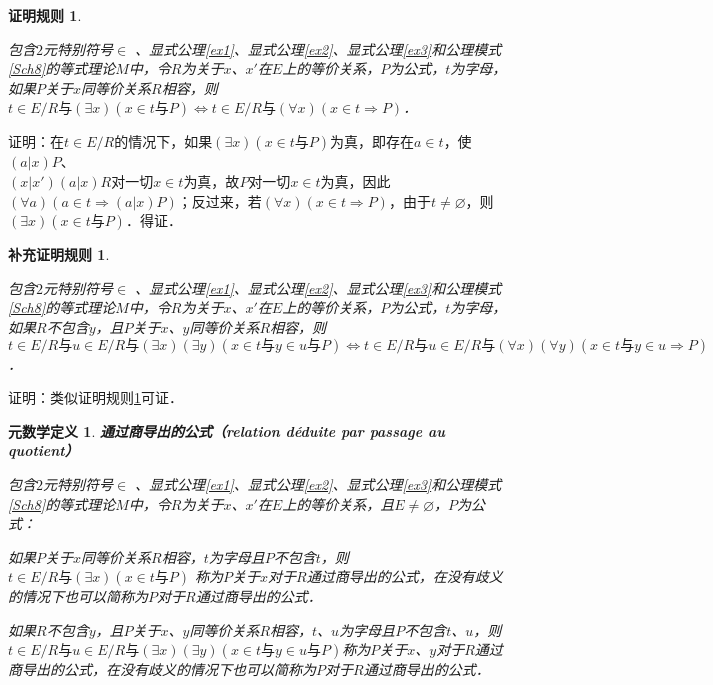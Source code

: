 \documentclass[12pt, a4paper, oneside]{book}
\newtheorem{metadef}{元数学定义}
\newtheorem{C}{证明规则}
\newtheorem{Ccor}{补充证明规则}
\begin{document}
			\begin{C}\label{C56}
				\hfill\par
				包含$2$元特别符号$\in$ 、显式公理\ref{ex1}、显式公理\ref{ex2}、显式公理\ref{ex3}和公理模式\ref{Sch8}的等式理论$M$中，令$R$为关于$x$、$x'$在$E$上的等价关系，$P$为公式，$t$为字母，如果$P$关于$x$同等价关系$R$相容，则$t\in E/R\text{与}(\exists x)(x\in t\text{与}P)\Leftrightarrow t\in E/R\text{与}(\forall x)(x\in t\Rightarrow P)$．
			\end{C}
			证明：在$t\in E/R$的情况下，如果$(\exists x)(x\in t\text{与}P)$为真，即存在$a\in t$，使$(a|x)P$、\\$(x|x')(a|x)R$对一切$x\in t$为真，故$P$对一切$x\in t$为真，因此$(\forall a)(a\in t\Rightarrow (a|x)P)$；反过来，若$(\forall x)(x\in t\Rightarrow P)$，由于$t\neq \varnothing$，则$(\exists x)(x\in t\text{与}P)$．得证．
			
			\begin{Ccor}\label{Ccor39}
				\hfill\par
				包含$2$元特别符号$\in$ 、显式公理\ref{ex1}、显式公理\ref{ex2}、显式公理\ref{ex3}和公理模式\ref{Sch8}的等式理论$M$中，令$R$为关于$x$、$x'$在$E$上的等价关系，$P$为公式，$t$为字母，如果$R$不包含$y$，且$P$关于$x$、$y$同等价关系$R$相容，则$t\in E/R\text{与}u\in E/R\text{与}(\exists x)(\exists y)(x\in t\text{与}y\in u\text{与}P)\Leftrightarrow t\in E/R\text{与}u\in E/R\text{与}(\forall x)(\forall y)(x\in t\text{与}y\in u\Rightarrow P)$．
			\end{Ccor}
			证明：类似证明规则\ref{C56}可证．

			\begin{metadef}
				\textbf{通过商导出的公式（relation déduite par passage au quotient）}
				\par
				包含$2$元特别符号$\in$ 、显式公理\ref{ex1}、显式公理\ref{ex2}、显式公理\ref{ex3}和公理模式\ref{Sch8}的等式理论$M$中，令$R$为关于$x$、$x'$在$E$上的等价关系，且$E\neq \varnothing$，$P$为公式：
				\par
				如果$P$关于$x$同等价关系$R$相容，$t$为字母且$P$不包含$t$，则$t\in E/R\text{与}(\exists x)(x\in t\text{与}P)$ 称为$P$关于$x$对于$R$通过商导出的公式，在没有歧义的情况下也可以简称为$P$对于$R$通过商导出的公式．
				\par
				如果$R$不包含$y$，且$P$关于$x$、$y$同等价关系$R$相容，$t$、$u$为字母且$P$不包含$t$、$u$，则$t\in E/R\text{与}u\in E/R\text{与}(\exists x)(\exists y)(x\in t\text{与}y\in u\text{与}P)$称为$P$关于$x$、$y$对于$R$通过商导出的公式，在没有歧义的情况下也可以简称为$P$对于$R$通过商导出的公式．
			\end{metadef}
\end{document}
